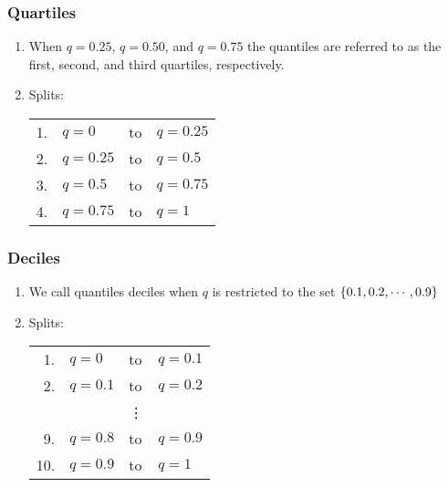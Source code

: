 \subsubsection{Quartiles \cite{statistics/book/Statistics-for-Data-Scientists/Maurits-Kaptein}} \label{Data/Describing Data/Central Tendency/Quartiles}

\begin{enumerate}
    \item When $q = 0.25$, $q = 0.50$, and $q = 0.75$ the quantiles are referred to as the first, second, and third quartiles, respectively. \cite{statistics/book/Statistics-for-Data-Scientists/Maurits-Kaptein}
    \label{Data/Describing Data/Central Tendency/Quartiles/first quartile}
    \label{Data/Describing Data/Central Tendency/Quartiles/second quartile}
    \label{Data/Describing Data/Central Tendency/Quartiles/third quartile}

    \item Splits: \\
    \begin{tabular}{r l l l} %
        1. & $q = 0$ & to & $q = 0.25$ \\
        2. & $q = 0.25$ & to & $q = 0.5$ \\
        3. & $q = 0.5$ & to & $q = 0.75$ \\
        4. & $q = 0.75$ & to & $q = 1$ \\
    \end{tabular}
\end{enumerate}



\subsubsection{Deciles \cite{statistics/book/Statistics-for-Data-Scientists/Maurits-Kaptein}} \label{Data/Describing Data/Central Tendency/Deciles}

\begin{enumerate}
    \item We call quantiles deciles when $q$ is restricted to the set $\left\{0.1, 0.2,\cdots, 0.9\right\}$

    \item Splits: \\
    \begin{tabular}{r l l l} %
        1. & $q = 0$ & to & $q = 0.1$ \\
        2. & $q = 0.1$ & to & $q = 0.2$ \\
        && \vdots & \\
        9. & $q = 0.8$ & to & $q = 0.9$ \\
        10. & $q = 0.9$ & to & $q = 1$ \\
    \end{tabular}
\end{enumerate}



